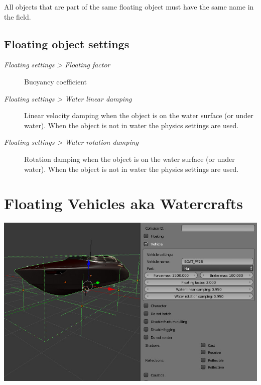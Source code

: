 \documentclass[a4paper,12pt,oneside]{sphinxmanual}
\begin{document}
All objects that are part of the same floating object must have the same name in the  field.


\subsection{Floating object settings}
\label{physics:id8}\begin{description}
\item[{\emph{Floating settings \textgreater{} Floating factor}}] \leavevmode
Buoyancy coefficient

\item[{\emph{Floating settings \textgreater{} Water linear damping}}] \leavevmode
Linear velocity damping when the object is on the water surface (or under water). When the object is not in water the physics settings are used.

\item[{\emph{Floating settings \textgreater{} Water rotation damping}}] \leavevmode
Rotation damping when the object is on the water surface (or under water). When the object is not in water the physics settings are used.

\end{description}


\section{Floating Vehicles aka Watercrafts}
\label{physics:id9}
\includegraphics[width=1.000\linewidth]{physics_boat.jpg}

\begin{DUlineblock}{0em}
\item[] 
\end{DUlineblock}
\end{document}
